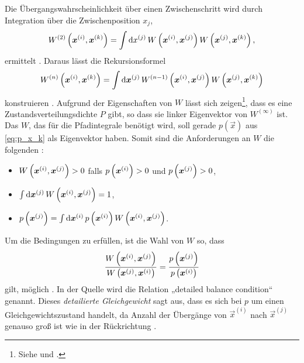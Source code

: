 
Die Übergangswahrscheinlichkeit über einen Zwischenschritt wird durch
Integration über die Zwischenposition $x_j$,
\[
    W^{(2)}\del{\vec x^{(i)}, \vec x^{(k)}} = \int \dif x^{(j)} \, W\del{\vec
    x^{(i)}, \vec x^{(j)}} W\del{\vec x^{(j)}, \vec x^{(k)}},
\]
ermittelt \parencite[(3.9)]{Creutz/Statistical_Approach_QM}. Daraus lässt die
Rekursionsformel
\[
    W^{(n)}\del{\vec x^{(i)}, \vec x^{(k)}} = \int \dif \vec x^{(j)} \,
    W^{(n-1)}\del{\vec x^{(i)},
    \vec x^{(j)}} W\del{\vec x^{(j)}, \vec x^{(k)}}
\]
konstruieren \parencite[(3.10)]{Creutz/Statistical_Approach_QM}. Aufgrund der
Eigenschaften von $W$ lässt sich zeigen\footnote{Siehe
\parencite[435]{Creutz/Statistical_Approach_QM} und
\parencite[Anhang~B]{Creutz/Statistical_Approach_QM}.}, dass es eine
Zustandsverteilungsdichte $P$ gibt, so dass sie linker Eigenvektor von
$W^{(\infty)}$ ist. Das $W$, das für die Pfadintegrale benötigt wird, soll
gerade $p(\vec x)$ aus \eqref{eq:p_x_k} als Eigenvektor haben. Somit sind die
Anforderungen an $W$ die folgenden
\parencite[(3.18)]{Creutz/Statistical_Approach_QM}:
\begin{itemize}
    \item
        $W\del{\vec x^{(i)}, \vec x^{(j)}} > 0$ falls $p\del{\vec x^{(i)}} > 0$
        und $p\del{\vec x^{(j)}} > 0$,
    \item
        $\int \dif \vec x^{(j)} \, W\del{\vec x^{(i)}, \vec x^{(j)}} = 1$,
    \item
        $p\del{\vec x^{(j)}} = \int \dif \vec x^{(i)} \, p\del{\vec x^{(i)}}
        W\del{\vec x^{(i)}, \vec x^{(j)}}$.
\end{itemize}


Um die Bedingungen zu erfüllen, ist die Wahl von $W$ so, dass
\[
    \frac{W\del{\vec x^{(i)}, \vec x^{(j)}}}{W\del{\vec x^{(j)}, \vec x^{(i)}}}
    = \frac{p\del{\vec x^{(j)}}}{p\del{\vec x^{(i)}}}
\]
gilt, möglich \parencite[(3.23)]{Creutz/Statistical_Approach_QM}. In der Quelle
wird die Relation „detailed balance condition“ genannt. Dieses
\emph{detailierte Gleichgewicht} sagt aus, dass es sich bei $p$ um einen
Gleichgewichtszustand handelt, da Anzahl der Übergänge von $\vec x^{(i)}$ nach
$\vec x^{(j)}$ genauso groß ist wie in der Rückrichtung
\parencite[85]{Schwabl/Quantenmechanik_fuer_Fortgeschrittene}.

